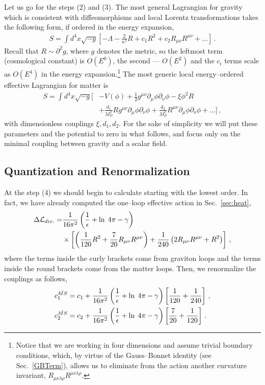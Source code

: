 \documentclass[12pt]{article}
\newcommand{\be}{\begin{equation}}
\newcommand{\ee}{\end{equation}}
\newcommand\m{\mu}
\newcommand\n{\nu}
\renewcommand\r{\rho}
\renewcommand\l{\lambda}
\def\d{\partial}
\renewcommand{\ln}{\mathop{\rm ln}\nolimits}
\begin{document}
Let us go for the steps (2) and (3).
The most general Lagrangian for gravity
which is consistent with diffeomorphisms and local Lorentz
transformations takes the following form, if ordered in the energy expansion,
\be
\begin{split}
S=\int d^4x\sqrt{-g}\left[-\Lambda -\frac{2}{\kappa^2}R+c_1 R^2+c_2 R_{\m\n}R^{\m\n}+...\right]\,.
\end{split}
\ee
Recall that $R\sim \d^2 g$, where $g$ denotes the metric, so the leftmost term (cosmological constant) is $O(E^0)$, the second --- $O(E^2)$ and the $c_i$ terms scale as $O(E^4)$ in the
energy expansion.\footnote{Notice that we are working in four dimensions and assume trivial
boundary conditions, which, by virtue of the Gauss--Bonnet identity (see Sec.~\ref{GBTerm}), allows us to eliminate from the action another curvature invariant,
$R_{\mu\nu\l \r}R^{\mu\nu\l \r}$.
}
The most generic local energy--ordered effective Lagrangian for matter is
\be
\begin{split}
S=\int d^4x\sqrt{-g}\Bigg[&-V(\phi)+\frac{1}{2}g^{\m\n}\d_\m\phi\d_\n\phi-\xi \phi^2 R\\
&+\frac{d_1}{M_P^2}Rg^{\m\n}\d_\m\phi\d_\n\phi+\frac{d_2}{M_P^2}R^{\m\n}\d_\m\phi\d_\n\phi
+...\Bigg] \,,
\end{split}
\ee
with dimensionless couplings $\xi,d_1,d_2$. 
For the sake of simplicity we will put these parameters and the potential to zero in
what follows, and focus only on the minimal coupling between gravity and a scalar field.

\subsection{Quantization and Renormalization}

At the step (4) we  should begin to calculate starting with the lowest order. In fact, we have already computed
the one--loop effective action in Sec.~\ref{sec:heat},
\be
\begin{split}
\Delta \mathcal{L}_{div.}=&\frac{1}{16\pi^2} \left(\frac{1}{\epsilon}+\ln \;4\pi-\gamma\right)\\
&\times \left[\left(\frac{1}{120}R^2+\frac{7}{20}R_{\m\n}R^{\m\n}\right)+\frac{1}{240}\left(2R_{\m\n}R^{\m\n}+R^2\right)\right]\,,
\end{split}
\ee
where the terms inside the curly brackets come from graviton loops and the terms inside the round brackets come from the matter loops. Then, we renormalize the couplings as follows,
\be
\begin{split}
& c_1^{\bar{MS}}=c_1+\frac{1}{16\pi^2} \left(\frac{1}{\epsilon}+\ln \;4\pi-\gamma\right)\left[\frac{1}{120}+\frac{1}{240}\right]\,,\\
& c_2^{\bar{MS}}=c_2+\frac{1}{16\pi^2} \left(\frac{1}{\epsilon}+\ln \;4\pi-\gamma\right)\left[\frac{7}{20}+\frac{1}{120}\right]\,.
\end{split}
\ee
\end{document}
